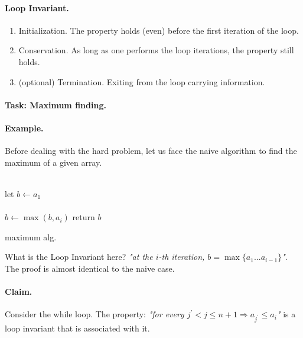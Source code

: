 \begin{tcolorbox}
\paragraph{Loop Invariant.} 
\begin{enumerate}
    \item Initialization. The property holds (even) before the first iteration of the loop.   
    \item Conservation. As long as one performs the loop iterations, the property still holds.
    \item (optional) Termination. Exiting from the loop carrying information.
\end{enumerate}
\end{tcolorbox}

\paragraph{Task: Maximum finding.}
\paragraph{Example.} Before dealing with the hard problem, let us face the naive algorithm to find the maximum of a given array.

\begin{tcolorbox}
\begin{algorithm}[H]
{}
 \ \\ 
 let \(b \leftarrow a_1 \) \\ 
 \ \\ 
  { 
        \(b \leftarrow \max \left(b, a_i \right) \)
    } 
 return \( b \) 
 \caption{maximum alg.}
\end{algorithm}
\end{tcolorbox}

What is the Loop Invariant here? \textit{"at the \(i\)-th iteration, \(b = \max{ \{ a_1 ... a_{i-1} \} } \)"}. The proof is almost identical to the naive case.   

\paragraph{Claim.} Consider the while loop. The property: \textit{"for every \(j^\prime < j \le n+1 \Rightarrow a_{j^\prime} \le a_i \)"} is a loop invariant that is associated with it. 

